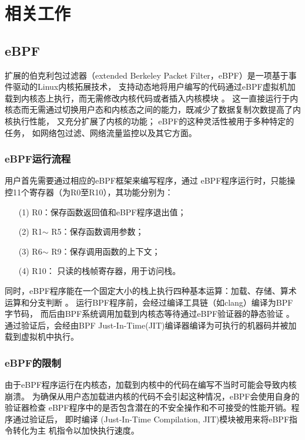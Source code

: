 \section{相关工作}
\label{section:relatedWork}
\subsection{eBPF}
    扩展的伯克利包过滤器（extended Berkeley Packet Filter，eBPF）是一项基于事件驱动的Linux内核拓展技术，
    支持动态地将用户编写的代码通过eBPF虚拟机加载到内核态上执行，而无需修改内核代码或者插入内核模块
    \cite{sunFindingCorrectnessBugs2024, YIHeCrossContainer, riceLearningEBPFProgramming2023}。
    这一直接运行于内核态而无需通过切换用户态和内核态之间的能力，既减少了数据复制次数提高了内核执行性能，
    又充分扩展了内核的功能\cite{YIHeCrossContainer, ZhangZiJunLinuxXiTonge}；
    eBPF的这种灵活性被用于多种特定的任务\cite{HaoValidating}，
    如网络包过滤\cite{10.1145/3371038, TCPdump}、网络流量监控\cite{9110434}以及其它方面\cite{280870, 258973}。

\subsubsection{eBPF运行流程}
    用户首先需要通过相应的eBPF框架来编写程序，通过\cite{riceLearningEBPFProgramming2023}
    eBPF程序运行时，只能操控11个寄存器（为R0至R10），其功能分别为：
    \begin{itemize}
        \item[(1)] R0：保存函数返回值和eBPF程序退出值；
        \item[(2)] R1$\sim$ R5：保存函数调用参数；
        \item[(3)] R6$\sim$ R9：保存调用函数的上下文；
        \item[(4)] R10： 只读的栈帧寄存器，用于访问栈。
    \end{itemize}

    同时，eBPF程序能在一个固定大小的栈上执行四种基本运算：加载、存储、算术运算和分支判断
    \cite{HaoValidating}。\nolinebreak
    运行BPF程序前，会经过编译工具链（如clang）编译为BPF字节码，
    而后由BPF系统调用加载到内核态等待通过eBPF验证器的静态验证
    \cite{zhengBpftimeUserspaceEBPF2023}。\nolinebreak
    通过验证后，会经由BPF Just-In-Time(JIT)编译器编译为可执行的机器码并被加载到虚拟机中执行。

\subsubsection{eBPF的限制}
    由于eBPF程序运行在内核态，加载到内核中的代码在编写不当时可能会导致内核崩溃。
    为确保从用户态加载进内核的代码不会引起这种情况，eBPF会使用自身的验证器检查
    eBPF程序中的是否包含潜在的不安全操作和不可接受的性能开销。程序通过验证后，
    即时编译 (Just-In-Time Compilation, JIT)模块被用来将eBPF指令转化为主
    机指令以加快执行速度\cite{FuzzOnEBPF}。

